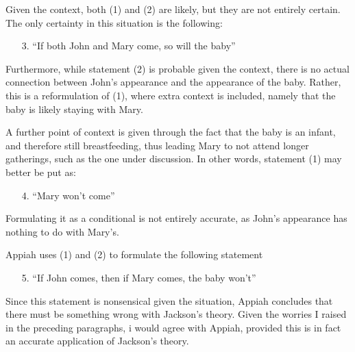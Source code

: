 \documentclass[12pt]{article}
\begin{document}
Given the context, both (1) and (2) are likely, but they are not entirely
certain. The only certainty in this situation is the following:
\begin{enumerate}
	\item[3.]
		``If both John and Mary come, so will the baby''
\end{enumerate}
Furthermore, while statement (2) is probable given the context, there is no
actual connection between John's appearance and the appearance of the baby.
Rather, this is a reformulation of (1), where extra context is included, namely
that the baby is likely staying with Mary.

A further point of context is given through the fact that the baby is an infant,
and therefore still breastfeeding, thus leading Mary to not attend longer
gatherings, such as the one under discussion. In other words, statement (1) may
better be put as:
\begin{enumerate}
	\item[4.]
		``Mary won't come''
\end{enumerate}
Formulating it as a conditional is not
entirely accurate, as John's appearance has nothing to do with Mary's.

Appiah uses (1) and (2) to formulate the following statement
\begin{enumerate}
	\item[5.]
		``If John comes, then if Mary comes, the baby won't''
\end{enumerate}
Since this statement is nonsensical given the situation, Appiah concludes that
there must be something wrong with Jackson's theory. Given the worries I raised
in the preceding paragraphs, i would agree with Appiah, provided this is in fact
an accurate application of Jackson's theory.
\end{document}
